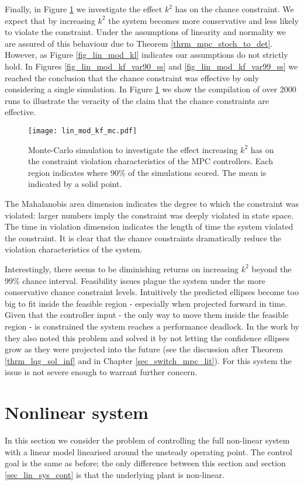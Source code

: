 Finally, in Figure \ref{fig_lin_mod_kf_mc} we investigate the effect $k^2$ has on the chance constraint. We expect that by increasing $k^2$ the system becomes more conservative and less likely to violate the constraint. Under the assumptions of linearity and normality we are assured of this behaviour due to Theorem \ref{thrm_mpc_stoch_to_det}. However, as Figure \ref{fig_lin_mod_kl} indicates our assumptions do not  strictly hold. In Figures \ref{fig_lin_mod_kf_var90_ss} and \ref{fig_lin_mod_kf_var99_ss} we reached the conclusion that the chance constraint was effective by only considering a single simulation. In Figure \ref{fig_lin_mod_kf_mc} we show the compilation of over 2000 runs to illustrate the veracity of the claim that the chance constraints are effective.
\begin{figure}[H] 
\centering
\texttt{[image: lin\_mod\_kf\_mc.pdf]}
\caption{Monte-Carlo simulation to investigate the effect increasing $k^2$ has on the constraint violation characteristics of the MPC controllers. Each region indicates where 90\% of the simulations scored. The mean is indicated by a solid point.}
\label{fig_lin_mod_kf_mc}
\end{figure}
The Mahalanobis area dimension indicates the degree to which the constraint was violated: larger numbers imply the constraint was deeply violated in state space. The time in violation dimension indicates the length of time the system violated the constraint. It is clear that the chance constraints dramatically reduce the violation characteristics of the system. 

Interestingly, there seems to be diminishing returns on increasing $k^2$ beyond the 99\% chance interval. Feasibility issues plague the system under the more conservative chance constraint levels. Intuitively the predicted ellipses become too big to fit inside the feasible region - especially when projected forward in time. Given that the controller input - the only way to move them inside the feasible region - is constrained the system reaches a performance deadlock. In the work by \cite{yan1} they also noted this problem and solved it by not letting the confidence ellipses grow as they were projected into the future (see the discussion after Theorem \ref{thrm_lqg_sol_inf} and in Chapter \ref{sec_switch_mpc_lit}). For this system the issue is not severe enough to warrant further concern.   

\section{Nonlinear system}
\label{sec_nonlinear_control}
In this section we consider the problem of controlling the full non-linear system with a linear model linearised around the unsteady operating point. The control goal is the same as before; the only difference between this section and section \ref{sec_lin_sys_cont} is that the underlying plant is non-linear.

